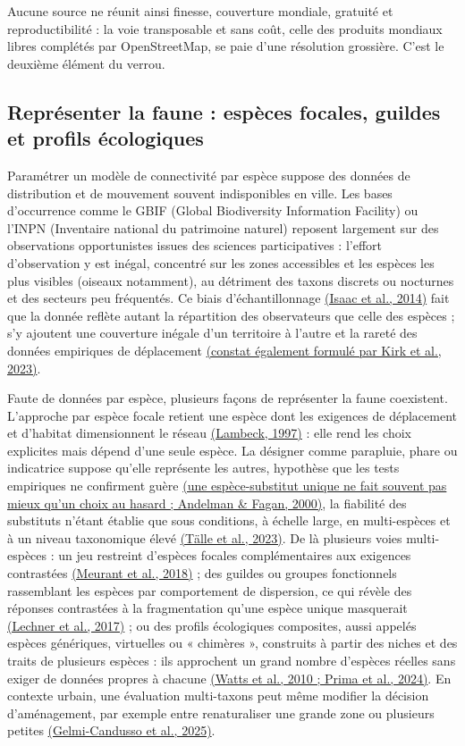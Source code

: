\documentclass[a4paper,11pt]{report}
\begin{document}
Aucune source ne réunit ainsi finesse, couverture mondiale, gratuité et reproductibilité : la voie transposable et sans coût, celle des produits mondiaux libres complétés par OpenStreetMap, se paie d'une résolution grossière. C'est le deuxième élément du verrou.

\subsection{Représenter la faune : espèces focales, guildes et profils écologiques}\label{sec:1.5.3}

Paramétrer un modèle de connectivité par espèce suppose des données de distribution et de mouvement souvent indisponibles en ville. Les bases d'occurrence comme le GBIF (Global Biodiversity Information Facility) ou l'INPN (Inventaire national du patrimoine naturel) reposent largement sur des observations opportunistes issues des sciences participatives : l'effort d'observation y est inégal, concentré sur les zones accessibles et les espèces les plus visibles (oiseaux notamment), au détriment des taxons discrets ou nocturnes et des secteurs peu fréquentés. Ce biais d'échantillonnage \hyperref[sec:bibliographie]{(Isaac et al., 2014)} fait que la donnée reflète autant la répartition des observateurs que celle des espèces ; s'y ajoutent une couverture inégale d'un territoire à l'autre et la rareté des données empiriques de déplacement \hyperref[sec:bibliographie]{(constat également formulé par Kirk et al., 2023)}.

Faute de données par espèce, plusieurs façons de représenter la faune coexistent. L'approche par espèce focale retient une espèce dont les exigences de déplacement et d'habitat dimensionnent le réseau \hyperref[sec:bibliographie]{(Lambeck, 1997)} : elle rend les choix explicites mais dépend d'une seule espèce. La désigner comme parapluie, phare ou indicatrice suppose qu'elle représente les autres, hypothèse que les tests empiriques ne confirment guère \hyperref[sec:bibliographie]{(une espèce-substitut unique ne fait souvent pas mieux qu'un choix au hasard ; Andelman \& Fagan, 2000)}, la fiabilité des substituts n'étant établie que sous conditions, à échelle large, en multi-espèces et à un niveau taxonomique élevé \hyperref[sec:bibliographie]{(Tälle et al., 2023)}. De là plusieurs voies multi-espèces : un jeu restreint d'espèces focales complémentaires aux exigences contrastées \hyperref[sec:bibliographie]{(Meurant et al., 2018)} ; des guildes ou groupes fonctionnels rassemblant les espèces par comportement de dispersion, ce qui révèle des réponses contrastées à la fragmentation qu'une espèce unique masquerait \hyperref[sec:bibliographie]{(Lechner et al., 2017)} ; ou des profils écologiques composites, aussi appelés espèces génériques, virtuelles ou « chimères », construits à partir des niches et des traits de plusieurs espèces : ils approchent un grand nombre d'espèces réelles sans exiger de données propres à chacune \hyperref[sec:bibliographie]{(Watts et al., 2010 ; Prima et al., 2024)}. En contexte urbain, une évaluation multi-taxons peut même modifier la décision d'aménagement, par exemple entre renaturaliser une grande zone ou plusieurs petites \hyperref[sec:bibliographie]{(Gelmi-Candusso et al., 2025)}.
\end{document}
